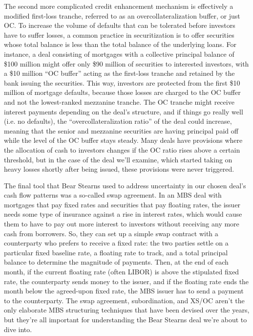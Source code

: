 \documentclass[12pt]{article}
\begin{document}
The second more complicated credit enhancement mechanism is effectively a modified first-loss tranche, referred to as an overcollateralization buffer, or just OC. To increase the volume of defaults that can be tolerated before investors have to suffer losses, a common practice in securitization is to offer securities whose total balance is less than the total balance of the underlying loans. For instance, a deal consisting of mortgages with a collective principal balance of \$100 million might offer only \$90 million of securities to interested investors, with a \$10 million “OC buffer” acting as the first-loss tranche and retained by the bank issuing the securities. This way, investors are protected from the first \$10 million of mortgage defaults, because those losses are charged to the OC buffer and not the lowest-ranked mezzanine tranche. The OC tranche might receive interest payments depending on the deal’s structure, and if things go really well (i.e. no defaults), the “overcollateralization ratio” of the deal could increase, meaning that the senior and mezzanine securities are having principal paid off while the level of the OC buffer stays steady. Many deals have provisions where the allocation of cash to investors changes if the OC ratio rises above a certain threshold, but in the case of the deal we’ll examine, which started taking on heavy losses shortly after being issued, these provisions were never triggered.
	
	The final tool that Bear Stearns used to address uncertainty in our chosen deal’s cash flow patterns was a so-called swap agreement. In an MBS deal with mortgages that pay fixed rates and securities that pay floating rates, the issuer needs some type of insurance against a rise in interest rates, which would cause them to have to pay out more interest to investors without receiving any more cash from borrowers. So, they can set up a simple swap contract with a counterparty who prefers to receive a fixed rate: the two parties settle on a particular fixed baseline rate, a floating rate to track, and a total principal balance to determine the magnitude of payments. Then, at the end of each month, if the current floating rate (often LIBOR) is above the stipulated fixed rate, the counterparty sends money to the issuer, and if the floating rate ends the month below the agreed-upon fixed rate, the MBS issuer has to send a payment to the counterparty. The swap agreement, subordination, and XS/OC aren’t the only elaborate MBS structuring techniques that have been devised over the years, but they’re all important for understanding the Bear Stearns deal we’re about to dive into.
\end{document}

